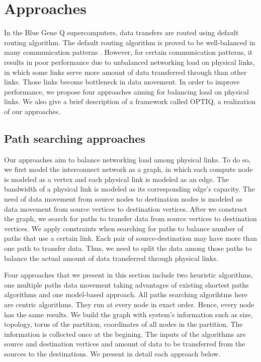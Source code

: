 \section{Approaches}
\label{sec:approach}

In the Blue Gene Q supercomputers, data transfers are routed using default routing algorithm. The default routing algorithm is proved to be well-balanced in many communication patterns \cite{Chen:BGQ}. However, for certain communication patterns, it results in poor performance due to unbalanced networking load on physical links, in which some links serve more amount of data transferred through than other links. Those links become bottleneck in data movement. In order to improve performance, we propose four approaches aiming for balancing load on physical links. We also give a brief description of a framework called OPTIQ, a realization of our approaches.

\subsection{Path searching approaches}
Our approaches aim to balance networking load among physical links. To do so, we first model the interconnect network as a graph, in which each compute node is modeled as a vertex and each physical link is modeled as an edge. The bandwidth of a physical link is modeled as its corresponding edge's capacity. The need of data movement from source nodes to destination nodes is modeled as data movement from source vertices to destination vertices. After we construct the graph, we search for paths to transfer data from source vertices to destination vertices. We apply constraints when searching for paths to balance number of paths that use a certain link. Each pair of source-destination may have more than one path to transfer data. Thus, we need to split the data among those paths to balance the actual amount of data transferred through physical links.

Four approaches that we present in this section include two heuristic algorithms, one multiple paths data movement taking advantages of existing shortest paths algorithms and one model-based approach. All paths searching algorihtms here are centric algorithms. They run at every node in exact order. Hence, every node has the same results. We build the graph with system's information such as size, topology, torus of the partition, coordinates of all nodes in the partition. The information is collected once at the begining. The inputs of the algorithms are source and destination vertices and amount of data to be transferred from the sources to the destinations. We present in detail each approach below.

